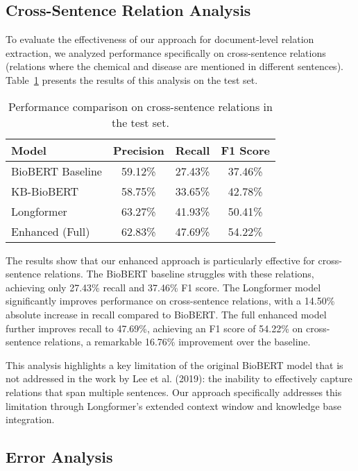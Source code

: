 \documentclass{amia}
\begin{document}
\subsection*{Cross-Sentence Relation Analysis}

To evaluate the effectiveness of our approach for document-level relation extraction, we analyzed performance specifically on cross-sentence relations (relations where the chemical and disease are mentioned in different sentences). Table~\ref{tab:cross} presents the results of this analysis on the test set.

\begin{table}[H]
\begin{center}
\begin{tabular}{|l|c|c|c|}
\hline
\textbf{Model} & \textbf{Precision} & \textbf{Recall} & \textbf{F1 Score} \\
\hline
BioBERT Baseline & 59.12\% & 27.43\% & 37.46\% \\
\hline
KB-BioBERT & 58.75\% & 33.65\% & 42.78\% \\
\hline
Longformer & 63.27\% & 41.93\% & 50.41\% \\
\hline
Enhanced (Full) & 62.83\% & 47.69\% & 54.22\% \\
\hline
\end{tabular}
\end{center}
\caption{Performance comparison on cross-sentence relations in the test set.}
\label{tab:cross}
\end{table}

The results show that our enhanced approach is particularly effective for cross-sentence relations. The BioBERT baseline struggles with these relations, achieving only 27.43\% recall and 37.46\% F1 score. The Longformer model significantly improves performance on cross-sentence relations, with a 14.50\% absolute increase in recall compared to BioBERT. The full enhanced model further improves recall to 47.69\%, achieving an F1 score of 54.22\% on cross-sentence relations, a remarkable 16.76\% improvement over the baseline.

This analysis highlights a key limitation of the original BioBERT model that is not addressed in the work by Lee et al. (2019): the inability to effectively capture relations that span multiple sentences. Our approach specifically addresses this limitation through Longformer's extended context window and knowledge base integration.

\subsection*{Error Analysis}
\end{document}
